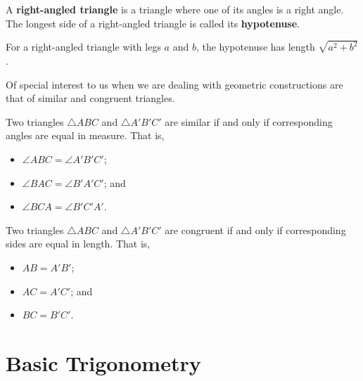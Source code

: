 \begin{definition}
    A \textbf{right-angled triangle} is a triangle where one of its angles is a right angle. The longest side of a right-angled triangle is called its \textbf{hypotenuse}.
\end{definition}

\begin{theorem}[Pythagoras]
    For a right-angled triangle with legs $a$ and $b$, the hypotenuse has length $\sqrt{a^2 + b^2}$.
\end{theorem}

Of special interest to us when we are dealing with geometric constructions are that of similar and congruent triangles.

\begin{definition}
    Two triangles $\triangle ABC$ and $\triangle A'B'C'$ are similar if and only if corresponding angles are equal in measure. That is,
    \begin{itemize}
        \item $\angle ABC = \angle A'B'C'$;
        \item $\angle BAC = \angle B'A'C'$; and
        \item $\angle BCA = \angle B'C'A'$.
    \end{itemize}
\end{definition}

\begin{definition}
    Two triangles $\triangle ABC$ and $\triangle A'B'C'$ are congruent if and only if corresponding sides are equal in length. That is,
    \begin{itemize}
        \item $AB = A'B'$;
        \item $AC = A'C'$; and
        \item $BC = B'C'$.
    \end{itemize}
\end{definition}

\section{Basic Trigonometry}

